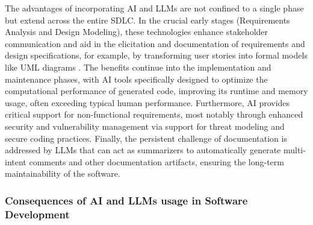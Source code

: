 The advantages of incorporating AI and LLMs are not confined to a single phase but extend across the entire SDLC. In the crucial early stages (Requirements Analysis and Design Modeling), these technologies enhance stakeholder communication and aid in the elicitation and documentation of requirements and design specifications, for example, by transforming user stories into formal models like UML diagrams \cite{Hemmat:2025rd}. The benefits continue into the implementation and maintenance phases, with AI tools specifically designed to optimize the computational performance of generated code, improving its runtime and memory usage, often exceeding typical human performance. Furthermore, AI provides critical support for non-functional requirements, most notably through enhanced security and vulnerability management via support for threat modeling and secure coding practices. Finally, the persistent challenge of documentation is addressed by LLMs that can act as summarizers to automatically generate multi-intent comments and other documentation artifacts, ensuring the long-term maintainability of the software.

\subsubsection{Consequences of AI and LLMs usage in Software Development}

